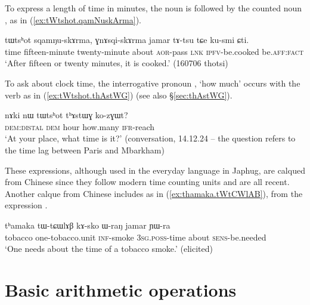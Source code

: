 To express a length of time in minutes, the noun    is followed by the counted noun , as in (\ref{ex:tWtshot.qamNuskArma}).
  
\begin{exe}
\ex \label{ex:tWtshot.qamNuskArma}
\gll  tɯtsʰot sqamŋu-skɤrma, ɣnɤsqi-skɤrma jamar tɤ-tsu tɕe ku-smi ɕti. \\
 time fifteen-minute twenty-minute about \textsc{aor}-pass \textsc{lnk} \textsc{ipfv}-be.cooked be.\textsc{aff}:\textsc{fact} \\
\glt `After fifteen or twenty minutes, it is cooked.' (160706 thotsi)
\end{exe}

To ask about clock time, the interrogative pronoun , `how much' occurs with the verb  as in (\ref{ex:tWtshot.thAstWG}) (see also §\ref{sec:thAstWG}).

\begin{exe}
\ex \label{ex:tWtshot.thAstWG}
\gll     nɤki nɯ tɯtsʰot tʰɤstɯɣ ko-zɣɯt? \\
 \textsc{dem}:\textsc{distal} \textsc{dem} hour how.many \textsc{ifr}-reach \\
\glt  `At your place, what time is it?' (conversation, 14.12.24 -- the question refers to the time lag between Paris and Mbarkham)
\end{exe}
    
These expressions, although used in the everyday language in Japhug, are calqued from Chinese since they follow modern time counting units and are all recent. Another calque from Chinese includes  as in  (\ref{ex:thamaka.tWtCWlAB}), from the expression .
 

\begin{exe}
\ex \label{ex:thamaka.tWtCWlAB}
\gll    tʰamaka tɯ-tɕɯlɤβ kɤ-sko ɯ-raŋ jamar ɲɯ-ra \\
tobacco  one-tobacco.unit \textsc{inf}-smoke \textsc{3sg}.\textsc{poss}-time about \textsc{sens}-be.needed \\
\glt `One needs about the time of a tobacco smoke.' (elicited)
\end{exe}
    
\section{Basic arithmetic operations} \label{sec:arithmetic}

